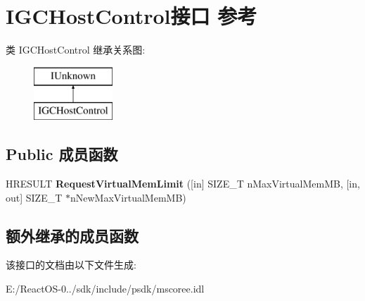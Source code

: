 \hypertarget{interface_i_g_c_host_control}{}\section{I\+G\+C\+Host\+Control接口 参考}
\label{interface_i_g_c_host_control}
类 I\+G\+C\+Host\+Control 继承关系图\+:\begin{figure}[H]
\begin{center}
\leavevmode
\includegraphics[height=2.000000cm]{interface_i_g_c_host_control}
\end{center}
\end{figure}
\subsection*{Public 成员函数}
\begin{DoxyCompactItemize}
\item 
\mbox{\label{interface_i_g_c_host_control_a63c51c04965ea00cdde7c9054210f231}} 
H\+R\+E\+S\+U\+LT {\bfseries Request\+Virtual\+Mem\+Limit} (\mbox{[}in\mbox{]} S\+I\+Z\+E\+\_\+T n\+Max\+Virtual\+Mem\+MB, \mbox{[}in, out\mbox{]} S\+I\+Z\+E\+\_\+T $\ast$n\+New\+Max\+Virtual\+Mem\+MB)
\end{DoxyCompactItemize}
\subsection*{额外继承的成员函数}


该接口的文档由以下文件生成\+:\begin{DoxyCompactItemize}
\item 
E\+:/\+React\+O\+S-\/0../sdk/include/psdk/mscoree.\+idl\end{DoxyCompactItemize}
